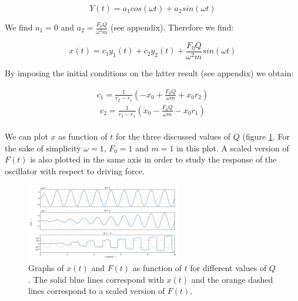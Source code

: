 \begin{equation*}
	Y(t) = a_1 cos(\omega t) + a_2 sin(\omega t)
\end{equation*}

We find $a_1 = 0$ and $a_2 = \frac{F_0 Q}{\omega^2 m}$ (see appendix). Therefore we find:

\begin{equation*}
	x(t) = c_1 y_1(t) + c_2 y_2(t) + \frac{F_0 Q}{\omega^2 m}sin(\omega t)
\end{equation*}

By imposing the initial conditions on the latter result (see appendix) we obtain:

\begin{align*}
	c_1 = \frac{1}{r_2-r_1} \left( -\dot{x}_0 + \frac{F_0 Q}{\omega m} + x_0 r_2 \right)
\end{align*}
\begin{align*}
	c_2 = \frac{1}{r_2-r_1} \left( \dot{x}_0 - \frac{F_0 Q}{\omega m} - x_0 r_1 \right) \\
\end{align*}

We can plot $x$ as function of $t$ for the three discussed values of $Q$ (figure \ref{fig_q1}. For the sake of simplicity $\omega = 1$, $F_0 = 1$ and $m = 1$ in this plot. A scaled version of $F(t)$ is also plotted in the same axis in order to study the response of the oscillator with respect to driving force. 

\begin{figure}[h!] 
	\centering
	\includegraphics[width=0.6\textwidth]{figures/graph_q1.png}
	\caption{Graphs of $x(t)$ and $F(t)$  as function of $t$ for different values of $Q$. The solid blue lines correspond with $x(t)$ and the orange dashed lines correspond to a scaled version of $F(t)$.}
	\label{fig_q1}
\end{figure}

